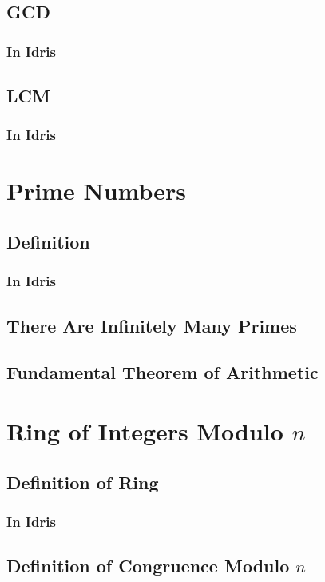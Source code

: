 \documentclass{article}
\begin{document}
\subsection{GCD}
\subsubsection{In Idris}

\subsection{LCM}
\subsubsection{In Idris}

\section{Prime Numbers}
\subsection{Definition}
\subsubsection{In Idris}

\subsection{There Are Infinitely Many Primes}

\subsection{Fundamental Theorem of Arithmetic}

\section{Ring of Integers Modulo $n$}
\subsection{Definition of Ring}
\subsubsection{In Idris}

\subsection{Definition of Congruence Modulo $n$}
\end{document}
